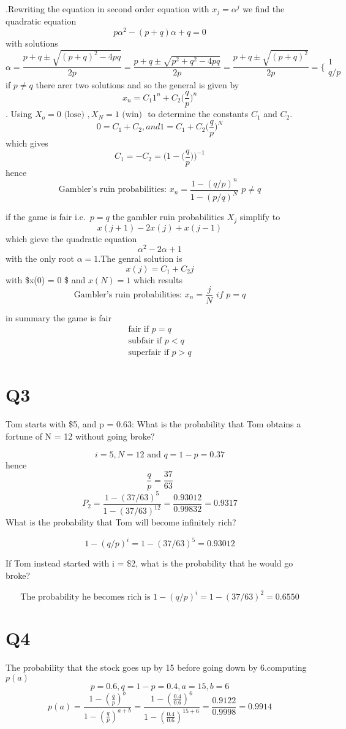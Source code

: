 \documentclass[
]{article}
\begin{document}
.Rewriting the equation in second order equation with \(x_j = \alpha^j\)
we find the quadratic equation \[p\alpha^2 - (p+q)\alpha+q=0\] with
solutions
\[\alpha = \frac{p+q \pm \sqrt{(p+q)^2-4pq}}{2p} = \frac{p+q \pm \sqrt{p^2+q^2-4pq}}{2p} = \frac{p+q \pm\sqrt{(p+q)^2}}{2p} = \bigg\{ \begin{array}{ll}1 \\ q/p\end{array} \]
if \(p \ne q\) there arer two solutions and so the general is given by
\[x_n = C_1 1^n + C_2 \bigg(\frac{q}{p} \bigg)^n\]. Using
\(X_o=0 \text{ (lose) },X_N=1 \text{ (win) }\) to determine the
constants \(C_1\) and \(C_2\).
\[0=C_1+C_2,  and 1=C_1+C_2\bigg(\frac{q}{p}\bigg)^N\] which gives
\[C_1 = -C_2 = \bigg(1-\bigg(\frac{q}{p}\bigg)\bigg)^{-1}\] hence
\[ \text{Gambler's ruin probabilities: } x_n = \frac{1-(q/p)^n}{1-(p/q)^N} \, \, p\ne q\]

if the game is fair i.e.~\(p=q\) the gambler ruin probabilities \(X_j\)
simplify to \[x(j+1)-2x(j)+x(j-1)\] which gieve the quadratic equation
\[\alpha^2 - 2\alpha +1\] with the only root \(\alpha =1\).The genral
solution is \[x(j)=C_1+C_2j\] with \$x(0) = 0 \$ and \(x(N) =1\) which
results
\[ \text{Gambler's ruin probabilities: } x_n = \frac{j}{N} \, \, if \,\,p = q\]

in summary the game is fair \[
\begin{aligned} 
\text{fair  if } p=q \\ 
\text{subfair if  } p < q \\ 
\text{superfair if } p > q 
\end{aligned}
\]

\hypertarget{q3}{%
\section{Q3}\label{q3}}

Tom starts with \$5, and p = 0.63: What is the probability that Tom
obtains a fortune of N = 12 without going broke?

\[i=5,N=12 \text{ and } q=1-p=0.37\] hence \[\frac{q}{p}=\frac{37}{63}\]
\[P_2 = \frac{1-(37/63)^5}{1-(37/63)^{12}} = \frac{0.93012}{0.99832} = 0.9317\]
What is the probability that Tom will become infinitely rich?

\[1-(q/p)^i = 1-(37/63)^5 = 0.93012 \]

If Tom instead started with i = \$2, what is the probability that he
would go broke?

\[ \text{The probability he becomes rich is } 1-(q/p)^i  = 1-(37/63)^2= 0.6550\]

\hypertarget{q4}{%
\section{Q4}\label{q4}}

The probability that the stock goes up by 15 before going down by
6.computing \(p(a)\) \[p=0.6,q=1-p=0.4,a=15,b=6\]
\[p(a)=\frac{1-(\frac{q}{p})^b}{1-(\frac{q}{p})^{a+b}} = \frac{1-(\frac{0.4}{0.6})^6}{1-(\frac{0.4}{0.6})^{15+6}} = \frac{0.9122}{0.9998} =0.9914 \]
\end{document}
